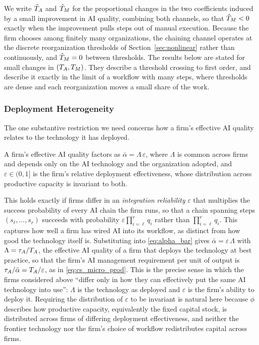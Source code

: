 We write $\hat{T}_{A}$ and $\hat{T}_{M}$ for the proportional changes in the two coefficients induced by a small improvement in AI quality, combining both channels, so that $\hat{T}_{M} < 0$ exactly when the improvement pulls steps out of manual execution.
Because the firm chooses among finitely many organizations, the chaining channel operates at the discrete reorganization thresholds of Section~\ref{sec:nonlinear} rather than continuously, and $\hat{T}_{M} = 0$ between thresholds.
The results below are stated for small changes in $(T_{A}, T_{M})$.
They describe a threshold crossing to first order, and describe it exactly in the limit of a workflow with many steps, where thresholds are dense and each reorganization moves a small share of the work.

\subsubsection*{Deployment Heterogeneity}

The one substantive restriction we need concerns how a firm's effective AI quality relates to the technology it has deployed.

\begin{assumption}
\label{as:neutral_heterogeneity}
A firm's effective AI quality factors as $\bar{\alpha} = \Lambda\,\varepsilon$, where $\Lambda$ is common across firms and depends only on the AI technology and the organization adopted, and $\varepsilon \in (0,1]$ is the firm's relative deployment effectiveness, whose distribution across productive capacity is invariant to both.
\end{assumption}

This holds exactly if firms differ in an \emph{integration reliability} $\varepsilon$ that multiplies the success probability of every AI chain the firm runs, so that a chain spanning steps $(s_\ell, \dotsc, s_r)$ succeeds with probability $\varepsilon \prod_{i=\ell}^{r} q_i$ rather than $\prod_{i=\ell}^{r} q_i$.
This captures how well a firm has wired AI into its workflow, as distinct from how good the technology itself is.
Substituting into \eqref{eq:alpha_bar} gives $\bar{\alpha} = \varepsilon\,\Lambda$ with $\Lambda = \tau_{A}/T_{A}$, the effective AI quality of a firm that deploys the technology at best practice, so that the firm's AI management requirement per unit of output is $\tau_{A}/\bar{\alpha} = T_{A}/\varepsilon$, as in \eqref{eq:cs_micro_prod}.
This is the precise sense in which the firms considered above ``differ only in how they can effectively put the same AI technology into use'': $\Lambda$ is the technology as deployed and $\varepsilon$ is the firm's ability to deploy it.
Requiring the distribution of $\varepsilon$ to be invariant is natural here because $\phi$ describes how productive capacity, equivalently the fixed capital stock, is distributed across firms of differing deployment effectiveness, and neither the frontier technology nor the firm's choice of workflow redistributes capital across firms.

